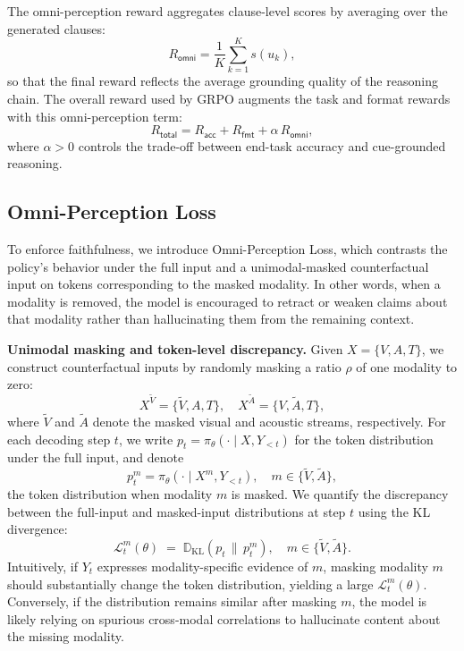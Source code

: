 \documentclass{article}
\theoremstyle{plain}
\theoremstyle{definition}
\theoremstyle{remark}
\begin{document}
The omni-perception reward aggregates clause-level scores by averaging over the generated clauses:
\begin{equation}
R_\mathsf{omni}
=\frac{1}{K}\sum_{k=1}^K s(u_k),
\end{equation}
so that the final reward reflects the average grounding quality of the reasoning chain.
The overall reward used by GRPO augments the task and format rewards with this omni-perception term:
\begin{equation}
\label{eq:rtotal}
R_\mathsf{total}
= R_\mathsf{acc} + R_\mathsf{fmt} + \alpha\, R_\mathsf{omni},
\end{equation}
where $\alpha>0$ controls the trade-off between end-task accuracy and cue-grounded reasoning.



\subsection{Omni-Perception Loss}
\label{sec:loss}
To enforce faithfulness, we introduce Omni-Perception Loss, which contrasts the policy’s behavior under the full input and a unimodal-masked counterfactual input on tokens corresponding to the masked modality.  
In other words, when a modality is removed, the model is encouraged to retract or weaken claims about that modality rather than hallucinating them from the remaining context. 

\noindent\textbf{Unimodal masking and token-level discrepancy.}
Given $X=\{V,A,T\}$, we construct  counterfactual inputs by randomly masking a ratio $\rho$ of one modality to zero:
\begin{equation}
    X^{\tilde{V}}=\{\tilde{V},A,T\}, \quad X^{\tilde{A}}=\{V,\tilde{A},T\},
\end{equation}
where $\tilde{V}$ and $\tilde{A}$ denote the masked visual and acoustic streams, respectively.
For each decoding step $t$, we write $p_t = \pi_\theta(\cdot \mid X, Y_{<t})$ for the token distribution under the full input, and denote
\begin{equation}
    p_t^{m} = \pi_\theta(\cdot \mid X^{ m}, Y_{<t}), \quad m \in \{\tilde{V},\tilde{A}\},
\end{equation}
the token distribution when modality $m$ is masked.
We quantify the discrepancy between the full-input and masked-input distributions at step $t$ using the KL divergence:
\begin{equation}
\label{eq:kl_token}
\mathcal{L}_t^{m}(\theta) \;=\; \mathbb{D}_{\mathrm{KL}}\!\left(p_t \,\|\, p_t^{m}\right),\quad 
m \in \{\tilde{V},\tilde{A}\}.
\end{equation}
Intuitively, if $Y_t$ expresses modality-specific evidence of $m$, masking modality $m$ should substantially change the token distribution, yielding a large $\mathcal{L}_t^{m}(\theta)$. Conversely, if the distribution remains similar after masking $m$, the model is likely relying on spurious cross-modal correlations to hallucinate content about the missing modality. 
\end{document}
